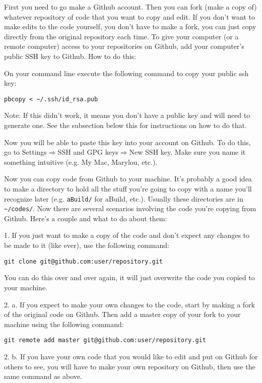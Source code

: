 \documentclass{article}
\begin{document}
First you need to go make a Github account. Then you can fork (make a
copy of) whatever repository of code that you want to copy and
edit. If you don't want to make edits to the code yourself, you don't
have to make a fork, you can just copy directly from the original
repository each time.
To give your computer (or a remote computer) access to your repositories
on Github, add your computer's public SSH key to Github. How to do
this:

On your command line execute the following command to copy
your public ssh key:
\begin{verbatim}
pbcopy < ~/.ssh/id_rsa.pub
\end{verbatim}
Note: If this didn't work, it means you don't have a public key and will
need to generate one. See the subsection below this for instructions
on how to do that. 

Now you will be able to paste this key into your account on Github. To
do this, go to Settings$\Rightarrow$SSH and GPG keys$\Rightarrow$New
SSH key. Make sure you name it something intuitive (e.g. My Mac,
Marylou, etc.). 

Now you can copy code from Github to your machine. It's
probably a good idea to make a directory to hold all the stuff you're
going to copy with a name you'll recognize later (e.g. \verb|aBuild/|
for aBuild, etc.). Usually these directories are in
\verb|~/codes/|. Now there are several scenarios involving the code
you're copying from Github. Here's a couple and what to do about them:

1. If you just want to make a copy of the code and don't
expect any changes to be made to it (like ever), use the following command:
\begin{verbatim}
git clone git@github.com:user/repository.git
\end{verbatim}
You can do this over and over again, it will just overwrite the code
you copied to your machine. 

2.
a. If you expect to make your own changes to the code, start by making
a fork of the original code on Github. Then add a master copy of your
fork to your machine using the following command:
\begin{verbatim}
git remote add master git@github.com:user/repository.git
\end{verbatim}
2.
b. If you have your own code that you would like to edit and put on
Github for others to see, you will have to make your own repository on
Github, then use the same command as above.
\end{document}
